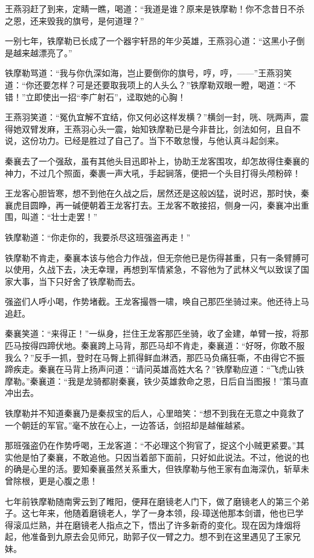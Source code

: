 \documentclass[12pt,oneside]{book}
\begin{document}
王燕羽赶了到来，定睛一瞧，喝道：``我道是谁？原来是铁摩勒！你不念昔日不杀之恩，还来毁我的旗号，是何道理？''

一别七年，铁摩勒已长成了一个器宇轩昂的年少英雄，王燕羽心道：``这黑小子倒是越来越漂亮了。''

铁摩勒骂道：``我与你仇深如海，岂止要倒你的旗号，哼，哼，------''王燕羽笑道：``你还要怎样？可是还要取我项上的人头么？''铁摩勒双眼一瞪，喝道：``不错！''立即使出一招``李广射石''，迳取她的心胸！

王燕羽笑道：``冤仇宜解不宜结，你又何必这样发横？''横剑一封，咣、咣两声，震得她双臂发麻，王燕羽心头一震，始知铁摩勒已是今非昔比，剑法如何，且自不说，这份功力。已经是胜过了自己了。当下不敢怠慢，与他认真斗起剑来。

秦襄去了一个强敌，虽有其他头目迅即补上，协助王龙客围攻，却怎故得住秦襄的神力，不过几个照面，秦裹一声大吼，手起锏落，便把一个头目打得头颅粉碎！

王龙客心胆皆寒，想不到他在久战之后，居然还是这般凶猛，说时迟，那时快，秦襄虎目圆睁，再一碱便朝着王龙客打去。王龙客不敢接招，侧身一闪，秦襄冲出重围，叫道：``壮士走罢！''

铁摩勒道：``你走你的，我要杀尽这班强盗再走！''

铁摩勒不肯走，秦襄本该与他合力作战，但无奈他已是伤得甚重，只有一条臂膊可以使用，久战下去，决无幸理，再想到军情紧急，不容他为了武林义气以致误了国家大事，当下只好舍了铁摩勒而去。

强盗们人呼小喝，作势堵截。王龙客撮唇一啸，唤自己那匹坐骑过来。他还待上马追赶。

秦襄笑道：``来得正！''一纵身，拦住王龙客那匹坐骑，收了金建，单臂一按，将那匹马按得四蹄伏地。秦襄跨上马背，那匹马却不肯走，秦襄道：``好呀，你敢不服我么？''反手一抓，登时在马臀上抓得鲜血淋洒，那匹马负痛狂嘶，不由得它不振蹄疾走。秦襄在马背上扬声问道：``请问英雄高姓大名？''铁摩勒应道：``飞虎山铁摩勒。''秦襄道：``我是龙骑都尉秦襄，铁少英雄救命之恩，日后自当图报！''策马直冲出去。

铁摩勒并不知道秦襄乃是秦叔宝的后人，心里暗笑：``想不到我在无意之中竟救了一个朝廷的军官。''毫不放在心上，一边答话，剑招却是越催越紧。

那班强盗仍在作势呼喝，王龙客道：``不必理这个狗官了，捉这个小贼更紧要。''其实他是怕了秦襄，不敢追他。只因当着部下面前，只好如此说法。不过，他说的也的确是心里的活。要知秦襄虽然关系重大，但铁摩勒与他王家有血海深仇，斩草未曾除根，更是心腹之患！

七年前铁摩勒随南霁云到了睢阳，便拜在磨镜老人门下，做了磨镜老人的第三个弟子。这七年来，他随着磨镜老人，学了一身本领，段-璋送他那本剑谱，他也已学得滚瓜烂熟，并在磨镜老人指点之下，悟出了许多新奇的变化。现在因为烽烟将起，他准备到九原去会见师兄，助郭子仪一臂之力。想不到在这里遇见了王家兄妹。
\end{document}
